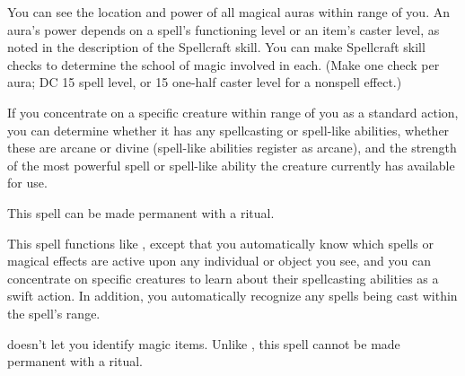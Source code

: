 \spellrng{\rngpers}
\begin{spelleffect}
  You can see the location and power of all magical auras within \rngmed range of you. An aura's power depends on a spell's functioning level or an item's caster level, as noted in the description of the Spellcraft skill. You can make Spellcraft skill checks to determine the school of magic involved in each. (Make one check per aura; DC 15 \add spell level, or 15 \add one-half caster level for a nonspell effect.)
  \par If you concentrate on a specific creature within \rngmed range of you as a standard action, you can determine whether it has any spellcasting or spell-like abilities, whether these are arcane or divine (spell-like abilities register as arcane), and the strength of the most powerful spell or spell-like ability the creature currently has available for use.
\end{spelleffect}
\begin{spellnotes}
This spell can be made permanent with a  ritual.
\end{spellnotes}

\begin{spelleffect}
  This spell functions like , except that you automatically know which spells or magical effects are active upon any individual or object you see, and you can concentrate on specific creatures to learn about their spellcasting abilities as a swift action. In addition, you automatically recognize any spells being cast within the spell's range.
\end{spelleffect}
\begin{spellnotes}
  \par {} doesn't let you identify magic items. Unlike , this spell cannot be made permanent with a  ritual.
\end{spellnotes}

